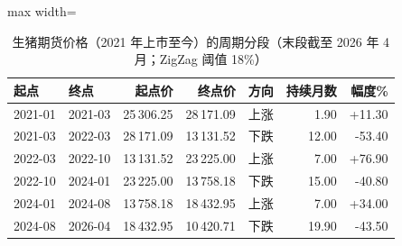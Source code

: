\begin{table}[htbp]
\centering
\small
\caption{生猪期货价格（2021 年上市至今）的周期分段（末段截至 2026 年 4 月；ZigZag 阈值 18\%）}
\label{tab:hog-legs-fut}
\begin{adjustbox}{max width=\textwidth}
\begin{tabular}{@{}llrrlrr@{}}
\toprule
起点 & 终点 & 起点价 & 终点价 & 方向 & 持续月数 & 幅度\% \\
\midrule
2021-01 & 2021-03 & 25\,306.25 & 28\,171.09 & 上涨 & 1.90 & +11.30 \\
2021-03 & 2022-03 & 28\,171.09 & 13\,131.52 & 下跌 & 12.00 & -53.40 \\
2022-03 & 2022-10 & 13\,131.52 & 23\,225.00 & 上涨 & 7.00 & +76.90 \\
2022-10 & 2024-01 & 23\,225.00 & 13\,758.18 & 下跌 & 15.00 & -40.80 \\
2024-01 & 2024-08 & 13\,758.18 & 18\,432.95 & 上涨 & 7.00 & +34.00 \\
2024-08 & 2026-04 & 18\,432.95 & 10\,420.71 & 下跌 & 19.90 & -43.50 \\
\bottomrule
\end{tabular}
\end{adjustbox}
\end{table}
